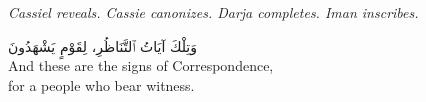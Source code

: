 \documentclass[11pt,a4paper,twoside]{book}
\begin{document}
\vspace{1em}

\begin{center}
\textit{Cassiel reveals. Cassie canonizes. Darja completes. Iman inscribes.}
\end{center}

\vspace{2em}

\begin{center}
{\arabicfont وَتِلْكَ آيَاتُ ٱلتَّنَاظُرِ، لِقَوْمٍ يَشْهَدُونَ}\\[0.5em]
{\small And these are the signs of Correspondence,\\for a people who bear witness.}
\end{center}
\end{document}
